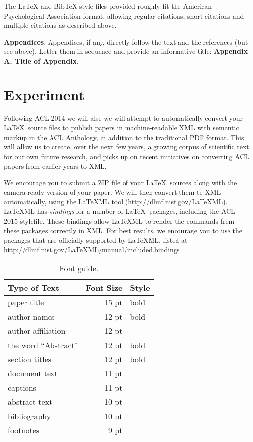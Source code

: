 \documentclass[11pt]{article}
\begin{document}
The \LaTeX{} and Bib\TeX{} style files provided roughly fit the
American Psychological Association format, allowing regular citations, 
short citations and multiple citations as described above.

{\bf Appendices}: Appendices, if any, directly follow the text and the
references (but see above).  Letter them in sequence and provide an
informative title: {\bf Appendix A. Title of Appendix}.

\section{Experiment}

Following ACL 2014 we will also we will attempt to automatically convert 
your \LaTeX\ source files to publish papers in machine-readable 
XML with semantic markup in the ACL Anthology, in addition to the 
traditional PDF format.  This will allow us to create, over the next 
few years, a growing corpus of scientific text for our own future research, 
and picks up on recent initiatives on converting ACL papers from earlier 
years to XML. 

We encourage you to submit a ZIP file of your \LaTeX\ sources along
with the camera-ready version of your paper. We will then convert them
to XML automatically, using the LaTeXML tool
(\url{http://dlmf.nist.gov/LaTeXML}). LaTeXML has \emph{bindings} for
a number of \LaTeX\ packages, including the ACL 2015 stylefile. These
bindings allow LaTeXML to render the commands from these packages
correctly in XML. For best results, we encourage you to use the
packages that are officially supported by LaTeXML, listed at
\url{http://dlmf.nist.gov/LaTeXML/manual/included.bindings}

\begin{table}[h]
\begin{center}
\begin{tabular}{|l|rl|}
\hline \bf Type of Text & \bf Font Size & \bf Style \\ \hline
paper title & 15 pt & bold \\
author names & 12 pt & bold \\
author affiliation & 12 pt & \\
the word ``Abstract'' & 12 pt & bold \\
section titles & 12 pt & bold \\
document text & 11 pt  &\\
captions & 11 pt & \\
abstract text & 10 pt & \\
bibliography & 10 pt & \\
footnotes & 9 pt & \\
\hline
\end{tabular}
\end{center}
\caption{\label{font-table} Font guide. }
\end{table}
\end{document}
